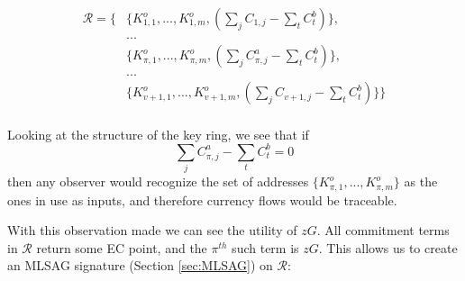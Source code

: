 \begin{align*}
  \mathcal{R} = \{ &\{K_{1,1}^o,...,K_{1,m}^o, (\sum\limits_j C_{1, j} - \sum\limits_t C^b_{t})\}, \\
  &... \\
  &\{K_{\pi,1}^o,...,K_{\pi,m}^o, (\sum\limits_j C^a_{\pi, j} - \sum\limits_t C^b_{t})\}, \\
  &... \\
  &\{K_{v+1,1}^o,...,K_{v+1,m}^o, (\sum\limits_j C_{v+1, j} - \sum\limits_t C^b_{t})\}\}
\end{align*}
\\

Looking at the structure of the key ring, we see that if  \[\sum\limits_j C^a_{\pi, j} -\sum\limits_t C^b_{t} = 0\] then any observer would recognize the set of addresses
$\{K_{\pi,1}^o,...,K_{\pi,m}^o\}$
as the ones in use as inputs, and therefore currency flows would be traceable.

With this observation made we can see the utility of $z G$. All commitment terms in $\mathcal{R}$ return some EC point, and the $\pi^{th}$ such term is $z G$. This allows us to create an MLSAG signature (Section \ref{sec:MLSAG}) on $\mathcal{R}$:


